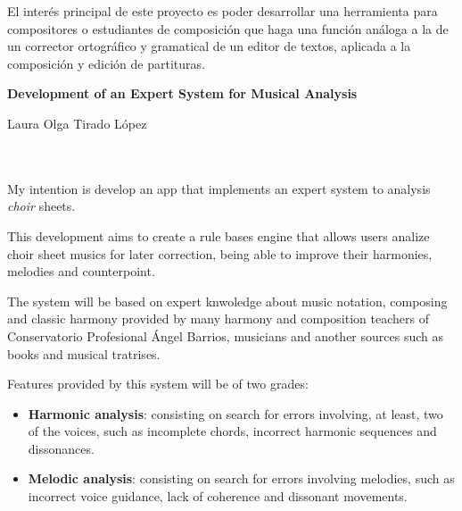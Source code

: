 \documentclass[a4paper, 12pt]{report} %
\numberwithin{equation}{section} %
\numberwithin{figure}{section} %
\numberwithin{table}{section} %
\begin{document}
\bigskip

El interés principal de este proyecto es poder desarrollar una herramienta para compositores o estudiantes de composición que haga una función análoga a la de un corrector ortográfico y gramatical de un editor de textos, aplicada a la composición y edición de partituras.

\cleardoublepage


\thispagestyle{empty}


\begin{center}
{\large\bfseries Development of an Expert System for Musical Analysis}\\
\end{center}
\begin{center}
Laura Olga Tirado López\\
\end{center}

\\

\vspace{0.7cm}
\\

My intention is develop an app that implements an expert system to analysis \textit{choir} sheets.

\bigskip

This development aims to create a rule bases engine that allows users analize choir sheet musics for later correction, being able to improve their harmonies, melodies and counterpoint.

\bigskip

The system will be based on expert knwoledge about music notation, composing and classic harmony provided by many harmony and composition teachers of Conservatorio Profesional Ángel Barrios, musicians and another sources such as books and musical tratrises.

\bigskip

Features provided by this system will be of two grades:

\begin{itemize}
	\item \textbf{Harmonic analysis}: consisting on search for errors involving, at least, two of the voices, such as incomplete chords, incorrect harmonic sequences and  dissonances.
	\item  \textbf{Melodic analysis}: consisting on search for errors involving melodies, such as incorrect voice guidance, lack of coherence and dissonant movements. 
\end{itemize}
\end{document}
